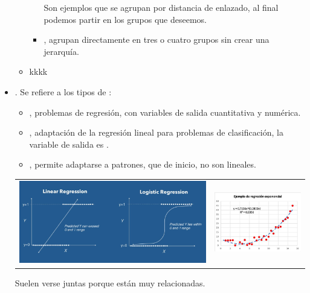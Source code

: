 \begin{itemize}
\begin{itemize}
\begin{itemize}
\begin{center}
            \end{center}
            Son ejemplos que se agrupan por distancia de enlazado, al final podemos partir en los grupos que deseemos.
            \item {}, agrupan directamente en tres o cuatro grupos sin crear una jerarquía.
        \end{itemize}
        \item kkkk
    \end{itemize}
    \item {}. Se refiere a los tipos de :
    \begin{itemize}
        \item {}, problemas de regresión, con variables de salida cuantitativa y numérica.
        \item {}, adaptación de la regresión lineal para problemas de clasificación, la variable de salida es .
        \item {}, permite adaptarse a patrones, que de inicio, no son lineales.
    \end{itemize}

    \begin{center}
        \begin{tabular}{ c c }
            \includegraphics[scale=.65]{images/mod01-21_1.jpg} &
            \includegraphics[scale=.35]{images/mod01-21_2.jpg}    
        \end{tabular}
    \end{center}
    Suelen verse juntas porque están muy relacionadas.
\end{itemize}

